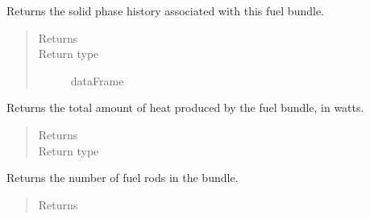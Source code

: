 \documentclass[letterpaper,10pt,openany,oneside,english]{sphinxmanual}
\begin{document}
\begin{fulllineitems}
\begin{fulllineitems}
\label{\detokenize{support_rst/fuel_bundle:fuel_bundle.FuelBundle.get_solid_phase}}
Returns the solid phase history associated with this fuel bundle.
\begin{quote}\begin{description}
\item[{Returns}] \leavevmode
{}

\item[{Return type}] \leavevmode
dataFrame

\end{description}\end{quote}

\end{fulllineitems}


\begin{fulllineitems}
\label{\detokenize{support_rst/fuel_bundle:fuel_bundle.FuelBundle.heat_pwr}}
Returns the total amount of heat produced by the fuel bundle, in watts.
\begin{quote}\begin{description}
\item[{Returns}] \leavevmode
{}

\item[{Return type}] \leavevmode
{}

\end{description}\end{quote}

\end{fulllineitems}


\begin{fulllineitems}
\label{\detokenize{support_rst/fuel_bundle:fuel_bundle.FuelBundle.n_fuel_rods}}
Returns the number of fuel rods in the bundle.
\begin{quote}\begin{description}
\item[{Returns}] \leavevmode
{}


\end{description}
\end{quote}
\end{fulllineitems}
\end{fulllineitems}
\end{document}
